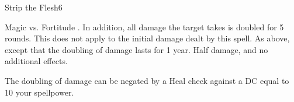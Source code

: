 \begin{spellsection}{Strip the Flesh}{6}
    \begin{spellheader}
    \end{spellheader}
    \begin{spellcontent}
        \begin{spelltargetinginfo}
        \end{spelltargetinginfo}
        \begin{spelleffects}
            \begin{spellattack}{Magic vs. Fortitude}
                \spellsuccess {}. In addition, all damage the target takes is doubled for 5 rounds. This does not apply to the initial damage dealt by this spell.
                \spellcritical As above, except that the doubling of damage lasts for 1 year.
                \spellfailure Half damage, and no additional effects.
            \end{spellattack}
        \end{spelleffects}
    \end{spellcontent}
    \begin{spellfooter}
        \spellnotes The doubling of damage can be negated by a Heal check against a DC equal to 10 \add your spellpower.

        \physicalspellnotes
        \miscastrandom
    \end{spellfooter}
\end{spellsection}

